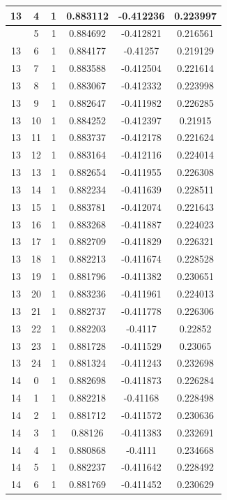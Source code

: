 \documentclass[12pt,a4paper]{article}
\numberwithin{equation}{section}
\numberwithin{figure}{section}
\numberwithin{table}{section}
\begin{document}
\begin{longtable}{|c|c|c|c|c|c|}
13 & 4 & 1 & 0.883112 & -0.412236 & 0.223997 \\ \hline
\pagebreak
13 & 5 & 1 & 0.884692 & -0.412821 & 0.216561 \\ \hline
13 & 6 & 1 & 0.884177 & -0.41257 & 0.219129 \\ \hline
13 & 7 & 1 & 0.883588 & -0.412504 & 0.221614 \\ \hline
13 & 8 & 1 & 0.883067 & -0.412332 & 0.223998 \\ \hline
13 & 9 & 1 & 0.882647 & -0.411982 & 0.226285 \\ \hline
13 & 10 & 1 & 0.884252 & -0.412397 & 0.21915 \\ \hline
13 & 11 & 1 & 0.883737 & -0.412178 & 0.221624 \\ \hline
13 & 12 & 1 & 0.883164 & -0.412116 & 0.224014 \\ \hline
13 & 13 & 1 & 0.882654 & -0.411955 & 0.226308 \\ \hline
13 & 14 & 1 & 0.882234 & -0.411639 & 0.228511 \\ \hline
13 & 15 & 1 & 0.883781 & -0.412074 & 0.221643 \\ \hline
13 & 16 & 1 & 0.883268 & -0.411887 & 0.224023 \\ \hline
13 & 17 & 1 & 0.882709 & -0.411829 & 0.226321 \\ \hline
13 & 18 & 1 & 0.882213 & -0.411674 & 0.228528 \\ \hline
13 & 19 & 1 & 0.881796 & -0.411382 & 0.230651 \\ \hline
13 & 20 & 1 & 0.883236 & -0.411961 & 0.224013 \\ \hline
13 & 21 & 1 & 0.882737 & -0.411778 & 0.226306 \\ \hline
13 & 22 & 1 & 0.882203 & -0.4117 & 0.22852 \\ \hline
13 & 23 & 1 & 0.881728 & -0.411529 & 0.23065 \\ \hline
13 & 24 & 1 & 0.881324 & -0.411243 & 0.232698 \\ \hline
14 & 0 & 1 & 0.882698 & -0.411873 & 0.226284 \\ \hline
14 & 1 & 1 & 0.882218 & -0.41168 & 0.228498 \\ \hline
14 & 2 & 1 & 0.881712 & -0.411572 & 0.230636 \\ \hline
14 & 3 & 1 & 0.88126 & -0.411383 & 0.232691 \\ \hline
14 & 4 & 1 & 0.880868 & -0.4111 & 0.234668 \\ \hline
14 & 5 & 1 & 0.882237 & -0.411642 & 0.228492 \\ \hline
14 & 6 & 1 & 0.881769 & -0.411452 & 0.230629 \\ \hline

\end{longtable}
\end{document}

